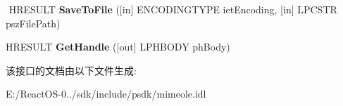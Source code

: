\begin{DoxyCompactItemize}
$$\mbox{\label{interface_m_i_m_e_o_l_e_1_1_i_mime_body_a14f2cfcfd1b80bdc3472d1714f23653d}} 
H\+R\+E\+S\+U\+LT {\bfseries Save\+To\+File} (\mbox{[}in\mbox{]} E\+N\+C\+O\+D\+I\+N\+G\+T\+Y\+PE iet\+Encoding, \mbox{[}in\mbox{]} L\+P\+C\+S\+TR psz\+File\+Path)
\item 
\mbox{\label{interface_m_i_m_e_o_l_e_1_1_i_mime_body_aa95c1fc6462a7618fd468e1308f4e8e4}} 
H\+R\+E\+S\+U\+LT {\bfseries Get\+Handle} (\mbox{[}out\mbox{]} L\+P\+H\+B\+O\+DY ph\+Body)
\end{DoxyCompactItemize}


该接口的文档由以下文件生成\+:\begin{DoxyCompactItemize}
\item 
E\+:/\+React\+O\+S-\/0../sdk/include/psdk/mimeole.\+idl\end{DoxyCompactItemize}
